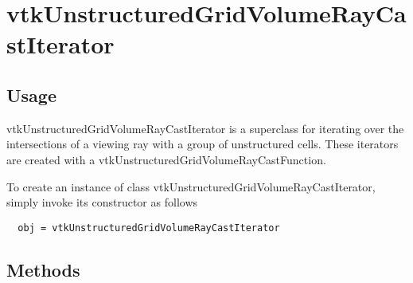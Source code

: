 \section{vtkUnstructuredGridVolumeRayCastIterator}

\subsection{Usage}


 vtkUnstructuredGridVolumeRayCastIterator is a superclass for iterating
 over the intersections of a viewing ray with a group of unstructured
 cells.  These iterators are created with a
 vtkUnstructuredGridVolumeRayCastFunction.


To create an instance of class vtkUnstructuredGridVolumeRayCastIterator, simply
invoke its constructor as follows
\begin{verbatim}
  obj = vtkUnstructuredGridVolumeRayCastIterator
\end{verbatim}
\subsection{Methods}

